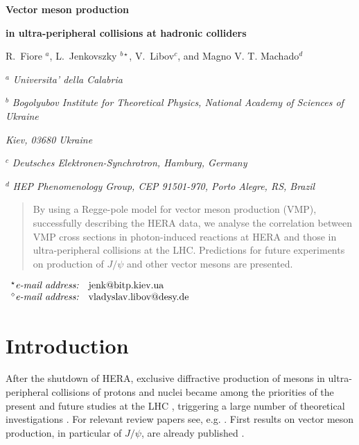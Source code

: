 \documentclass[12pt]{article}
\begin{document}
\vskip 0.5cm \centerline{\bf\Large Vector meson production}
\centerline{\bf\Large in ultra-peripheral collisions at hadronic colliders}  \vskip 0.3cm
\centerline{R.~Fiore $^a$, L.~Jenkovszky $^{b\star}$, V.~Libov$^c$, and Magno V. T. Machado$^d$}

\vskip 1cm

\centerline{$^a$ \sl Universita' della Calabria}
\centerline{$^b$ \sl Bogolyubov Institute for Theoretical Physics,
National Academy of Sciences of Ukraine} \centerline{\sl Kiev,
03680 Ukraine}
\centerline{$^c$ \sl Deutsches Elektronen-Synchrotron, Hamburg, Germany}
\centerline{$^d$ \sl HEP Phenomenology Group, CEP 91501-970, Porto Alegre, RS, Brazil
}
\vskip
0.1cm

\begin{abstract}\noindent
By using a Regge-pole model for vector meson production (VMP), successfully describing the HERA data, we analyse the correlation between VMP cross sections in photon-induced reactions at HERA and those in ultra-peripheral collisions at the LHC.
Predictions for future experiments on production of $J/\psi$ and other vector mesons are presented.
\end{abstract}

\vskip 0.1cm

$
\begin{array}{ll}

^{\star}\mbox{{\it e-mail address:}} &
   \mbox{jenk@bitp.kiev.ua} \\
^{\diamond}\mbox{{\it e-mail address:}} &
   \mbox{vladyslav.libov@desy.de} \\

\end{array}
$


\section{Introduction}\label{Int}

After the shutdown of HERA, exclusive diffractive production of mesons in ultra-peripheral collisions of protons and nuclei became among the priorities of the present and future studies at the LHC \cite{LHCb1, LHCb2}, triggering a large number of theoretical investigations \cite{Schafer, Brazil, Ryskin, Motyka, Szczurek, Recent}.
For relevant review papers see, e.g. \cite{Review}.
First results on vector meson production, in particular of $J/\psi$, are already published \cite{LHCb1, LHCb2}.
\end{document}
